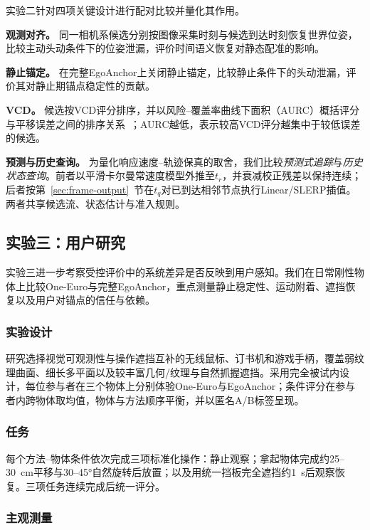 \documentclass[review]{vgtc}
\begin{document}
实验二针对四项关键设计进行配对比较并量化其作用。

\textbf{观测对齐。}
同一相机系候选分别按图像采集时刻与候选到达时刻恢复世界位姿，比较主动头动条件下的位姿泄漏，评价时间语义恢复对静态配准的影响。

\textbf{静止锚定。}
在完整EgoAnchor上关闭静止锚定，比较静止条件下的头动泄漏，评价其对静止期锚点稳定性的贡献。

\textbf{VCD。}
候选按VCD评分排序，并以风险--覆盖率曲线下面积（AURC）概括评分与平移误差之间的排序关系~\cite{riskcontrolled2020,ding2020uncertainty}；AURC越低，表示较高VCD评分越集中于较低误差的候选。

\textbf{预测与历史查询。}
为量化响应速度--轨迹保真的取舍，我们比较\emph{预测式追踪}与\emph{历史状态查询}。前者以平滑卡尔曼常速度模型外推至$t_r$，并衰减校正残差以保持连续；后者按第~\ref{sec:frame-output}~节在$t_q$对已到达相邻节点执行Linear/SLERP插值。两者共享候选流、状态估计与准入规则。

\subsection{实验三：用户研究}\label{sec:exp3-design}

实验三进一步考察受控评价中的系统差异是否反映到用户感知。我们在日常刚性物体上比较One-Euro与完整EgoAnchor，重点测量静止稳定性、运动附着、遮挡恢复以及用户对锚点的信任与依赖。

\subsubsection{实验设计}

研究选择视觉可观测性与操作遮挡互补的无线鼠标、订书机和游戏手柄，覆盖弱纹理曲面、细长多平面以及较丰富几何/纹理与自然抓握遮挡。采用完全被试内设计，每位参与者在三个物体上分别体验One-Euro与EgoAnchor；条件评分在参与者内跨物体取均值，物体与方法顺序平衡，并以匿名A/B标签呈现。

\subsubsection{任务}

每个方法--物体条件依次完成三项标准化操作：静止观察；拿起物体完成约25--30~cm平移与30--45°自然旋转后放置；以及用统一挡板完全遮挡约1~s后观察恢复。三项任务连续完成后统一评分。

\subsubsection{主观测量}
\end{document}
